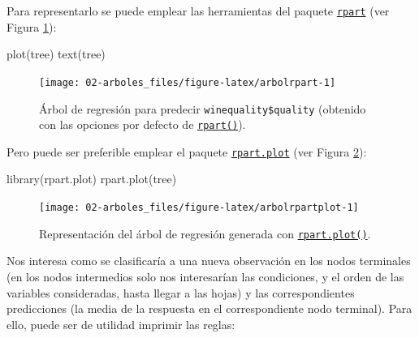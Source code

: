 \documentclass[
]{book}
\newenvironment{Shaded}{\begin{snugshade}}{\end{snugshade}}
\newcommand{\FunctionTok}[1]{\textcolor[rgb]{0.00,0.00,0.00}{#1}}
\newcommand{\NormalTok}[1]{#1}
\theoremstyle{break}
\theoremstyle{nonumberplain}
\begin{document}
Para representarlo se puede emplear las herramientas del paquete \href{https://CRAN.R-project.org/package=rpart}{\texttt{rpart}} (ver Figura \ref{fig:arbolrpart}):



\begin{Shaded}
\begin{Highlighting}[]
\FunctionTok{plot}\NormalTok{(tree)}
\FunctionTok{text}\NormalTok{(tree)}
\end{Highlighting}
\end{Shaded}

\begin{figure}[!htb]

{\centering \texttt{[image: 02-arboles\_files/figure-latex/arbolrpart-1]} 

}

\caption{Árbol de regresión para predecir \texttt{winequality\$quality} (obtenido con las opciones por defecto de \href{https://rdrr.io/pkg/rpart/man/rpart.html}{\texttt{rpart()}}).}\label{fig:arbolrpart}
\end{figure}

Pero puede ser preferible emplear el paquete \href{https://CRAN.R-project.org/package=rpart.plot}{\texttt{rpart.plot}} (ver Figura \ref{fig:arbolrpartplot}):



\begin{Shaded}
\begin{Highlighting}[]
\FunctionTok{library}\NormalTok{(rpart.plot)}
\FunctionTok{rpart.plot}\NormalTok{(tree)  }
\end{Highlighting}
\end{Shaded}

\begin{figure}[!htb]

{\centering \texttt{[image: 02-arboles\_files/figure-latex/arbolrpartplot-1]} 

}

\caption{Representación del árbol de regresión generada con \href{https://rdrr.io/pkg/rpart.plot/man/rpart.plot.html}{\texttt{rpart.plot()}}.}\label{fig:arbolrpartplot}
\end{figure}

Nos interesa como se clasificaría a una nueva observación en los nodos terminales (en los nodos intermedios solo nos interesarían las condiciones, y el orden de las variables consideradas, hasta llegar a las hojas) y las correspondientes predicciones (la media de la respuesta en el correspondiente nodo terminal).
Para ello, puede ser de utilidad imprimir las reglas:
\end{document}
